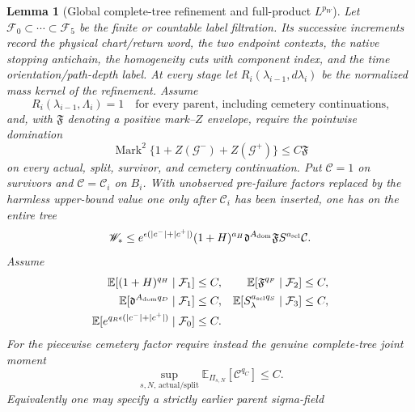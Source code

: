 \documentclass[11pt]{article}
\newtheorem{lemma}[theorem]{Lemma}
\begin{document}
\begin{lemma}[Global complete-tree refinement and full-product $L^{p_W}$]
\label{lem:measurable-refinement-moments}
Let $\mathcal F_0\subset\cdots\subset\mathcal F_5$ be the finite or countable
label filtration.  Its successive increments record the physical
chart/return word, the two endpoint contexts, the native stopping antichain,
the homogeneity cuts with component index, and the time
orientation/path-depth label.  At every stage let
$R_i(\lambda_{i-1},d\lambda_i)$ be the normalized
mass kernel of the refinement.  Assume
\begin{equation}
\label{eq:refinement-kernel-mass}
 R_i(\lambda_{i-1},\Lambda_i)=1
 \quad\text{for every parent, including cemetery continuations,}
\end{equation}
and, with $\mathfrak F$ denoting a positive mark--$Z$ envelope, require the
pointwise domination
\begin{equation}
\label{eq:full-mark-cemetery-domination}
 \operatorname{Mark}^2
 \{1+Z(\mathcal G^-)+Z(\mathcal G^+)\}\le C\mathfrak F
\end{equation}
on every actual, split, survivor, and cemetery continuation.  Put
$\mathcal C=1$ on survivors and $\mathcal C=\mathcal C_i$ on $B_i$.
With unobserved pre-failure factors replaced by the harmless upper-bound
value one only after $\mathcal C_i$ has been inserted, one has on the entire
tree
\begin{equation}
\label{eq:full-cemetery-product-envelope}
 \mathscr W_*\le
 e^{\epsilon(|c^-|+|c^+|)}(1+H)^{a_H}
 \mathfrak d^{A_{\rm dom}}\mathfrak F
 S^{a_{\rm scl}}\mathcal C.
\end{equation}
Assume
\begin{align}
 \mathbb E[(1+H)^{q_H}\mid\mathcal F_1]&\le C,&
 \mathbb E[\mathfrak F^{q_F}\mid\mathcal F_2]&\le C,
 \label{eq:conditional-refinement-moments}\\
 \mathbb E[\mathfrak d^{A_{\rm dom}q_D}\mid\mathcal F_1]&\le C,&
 \mathbb E[S_\lambda^{a_{\rm scl}q_S}\mid\mathcal F_3]&\le C,
 \notag\\
 \mathbb E[e^{q_R\epsilon(|c^-|+|c^+|)}\mid\mathcal F_0]&\le C.
 \notag
\end{align}
For the piecewise cemetery factor require instead the genuine complete-tree
joint moment
\begin{equation}
\label{eq:complete-tree-cemetery-moment}
 \sup_{s,N,\,\mathrm{actual/split}}
 \mathbb E_{\Pi_{s,N}}[\mathcal C^{q_C}]\le C.
\end{equation}
Equivalently one may specify a strictly earlier parent sigma-field

\end{lemma}
\end{document}

